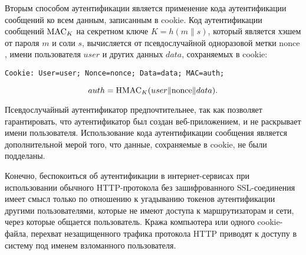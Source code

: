 Вторым способом аутентификации является применение кода аутентификации сообщений ко всем данным, записанным в cookie. Код аутентификации сообщений $\textrm{MAC}_K$ на секретном ключе $K = h(m \| s)$, который является хэшем от пароля $m$ и соли $s$, вычисляется от псевдослучайной одноразовой метки $\textrm{nonce}$, имени пользователя $user$ и других данных $data$, сохраняемых в cookie:
\begin{center} \begin{verbatim}
Cookie: User=user; Nonce=nonce; Data=data; MAC=auth;
\end{verbatim} \end{center}
    \[ auth = \textrm{HMAC}_K(user \| \textrm{nonce} \| data). \]

Псевдослучайный аутентификатор предпочтительнее, так как позволяет гарантировать, что аутентификатор был создан веб-приложением, и не раскрывает имени пользователя. Использование кода аутентификации сообщения является дополнительной мерой того, что данные, сохраняемые в cookie, не были подделаны.

Конечно, беспокоиться об аутентификации в интернет-сервисах при использовании обычного HTTP-протокола без зашифрованного SSL-соединения имеет смысл только по отношению к угадыванию токенов аутентификации другими пользователями, которые не имеют доступа к маршрутизаторам и сети, через которые общается пользователь. Кража компьютера или одного cookie-файла, перехват незащищенного трафика протокола HTTP приводят к доступу в систему под именем взломанного пользователя.
